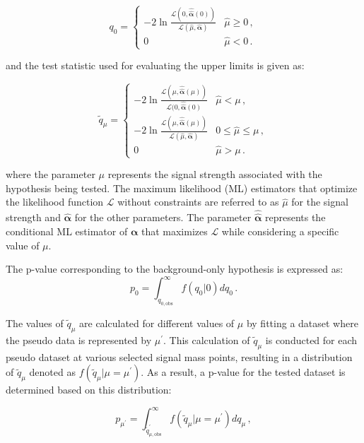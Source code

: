 \begin{equation}
q_0 = \left\{ 
\begin{array}{ll}
-2\ln\frac{\mathcal{L}(0,\hat{\hat{\bm\alpha}}(0))}
{\mathcal{L}(\hat{\mu},\hat{\bm\alpha})} 
& \hat{\mu} \ge 0\, ,\\ 
0 & \hat{\mu} < 0\, .
\end{array}
\right.
\end{equation}

\noindent
and the test statistic used for evaluating the upper limits is given as:

\begin{equation}
\tilde{q}_\mu = \left\{ 
\begin{array}{ll}
-2\ln\frac{\mathcal{L}(\mu,\hat{\hat{\bm\alpha}}(\mu))}
{\mathcal{L}(0,\hat{\hat{\bm\alpha}}(0)}
& \hat{\mu} < \mu\, ,\\ 
-2\ln\frac{\mathcal{L}(\mu,\hat{\hat{\bm\alpha}}(\mu))}
{\mathcal{L}(\hat{\mu},\hat{\bm\alpha})} 
& 0 \le \hat{\mu} \le \mu\, ,\\ 
0 & \hat{\mu} > \mu\, .
\end{array}
\right.
\end{equation}

\noindent
where the parameter $\mu$ represents the signal strength associated with the hypothesis being tested. The maximum likelihood (ML) estimators that optimize the likelihood function $\mathcal{L}$ without constraints are referred to as $\hat{\mu}$ for the signal strength and $\hat{\bm\alpha}$ for the other parameters. The parameter $\hat{\hat{\bm\alpha}}$ represents the conditional ML estimator of $\bm\alpha$ that maximizes $\mathcal{L}$ while considering a specific value of $\mu$.

The p-value corresponding to the background-only hypothesis is expressed as:
\begin{equation}
p_0 = \int_{q_{0,\mathrm{obs}}}^\infty
f(q_0|0) dq_0\, .
\end{equation}

The values of $\tilde{q}_\mu$ are calculated for different values of $\mu$ by fitting a dataset where the pseudo data is represented by $\mu^\prime$. This calculation of $\tilde{q}_\mu$ is conducted for each pseudo dataset at various selected signal mass points, resulting in a distribution of $\tilde{q}_\mu$ denoted as $f(\tilde{q}_\mu|\mu = \mu^\prime)$. As a result, a p-value for the tested dataset is determined based on this distribution:

\begin{equation}
p_{\mu^\prime} = \int_{\tilde{q}^\prime_{\mu,\mathrm{obs}}}^\infty
f(\tilde{q}_\mu|\mu = \mu^\prime) dq_\mu\, ,
\end{equation}


